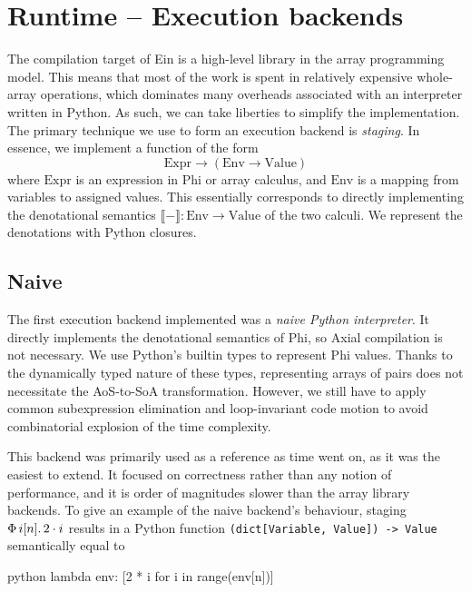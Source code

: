 
\section{Runtime -- Execution backends}
\label{execution-backend}

The compilation target of Ein is a high-level library in the array programming model. This means that most of the work is spent in relatively expensive whole-array operations, which dominates many overheads associated with an interpreter written in Python. As such, we can take liberties to simplify the implementation. The primary technique we use to form an execution backend is \textit{staging}. In essence, we implement a function of the form
$$ \mathrm{Expr} \to \left( \mathrm{Env} \to \mathrm{Value} \right) $$
where $\mathrm{Expr}$ is an expression in Phi or array calculus, and $\mathrm{Env}$ is a mapping from variables to assigned values. This essentially corresponds to directly implementing the denotational semantics $\llbracket - \rrbracket : \mathrm{Env} \to \mathrm{Value}$ of the two calculi. We represent the denotations with Python closures.

\subsection{Naive}

The first execution backend implemented was a \textit{naive Python interpreter}. It directly implements the denotational semantics of Phi, so Axial compilation is not necessary. We use Python's builtin types to represent Phi values. Thanks to the dynamically typed nature of these types, representing arrays of pairs does not necessitate the AoS-to-SoA transformation. However, we still have to apply common subexpression elimination and loop-invariant code motion to avoid combinatorial explosion of the time complexity.

This backend was primarily used as a reference as time went on, as it was the easiest to extend. It focused on correctness rather than any notion of performance, and it is order of magnitudes slower than the array library backends. To give an example of the naive backend's behaviour, staging $\Phi\, {i}[{n}] \ldotp {2 \cdot i}$ results in a Python function \texttt{(dict[Variable, Value]) -> Value} semantically equal to
\begin{center}
\begin{cminted}{python}
lambda env: [2 * i for i in range(env[n])]
\end{cminted}    
\end{center}

